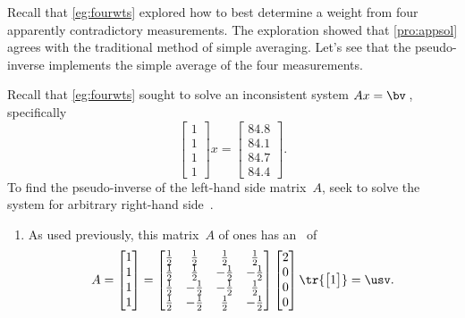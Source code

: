\begin{example} \label{ex:} 
Recall that \autoref{eg:fourwts} explored how to best determine a  weight from four apparently contradictory measurements.
The exploration showed that \autoref{pro:appsol} agrees with the traditional method of simple averaging.
Let's see that the pseudo-inverse implements the simple average of the four measurements.

Recall that \autoref{eg:fourwts} sought to solve an inconsistent system \(Ax=\bv\)\,, specifically
\begin{equation*}
\begin{bmatrix} 1\\1\\1\\1 \end{bmatrix}x
=\begin{bmatrix} 84.8\\84.1\\84.7\\84.4 \end{bmatrix}.
\end{equation*}
To find the pseudo-inverse of the left-hand side matrix~\(A\), seek to solve the system for arbitrary right-hand side~\bv.
\begin{enumerate}
\item As used previously, this matrix~\(A\) of ones has an \svd\ of
\def\h{\frac12}
\begin{equation*}
A=\begin{bmatrix} 1\\1\\1\\1 \end{bmatrix}
=\begin{bmatrix} \h&\h&\h&\h
\\\h&\h&-\h&-\h
\\\h&-\h&-\h&\h
\\\h&-\h&\h&-\h \end{bmatrix}
\begin{bmatrix} 2\\0\\0\\0 \end{bmatrix}
\tr{\begin{bmatrix} 1 \end{bmatrix}}
=\usv.
\end{equation*}


\end{enumerate}
\end{example}
